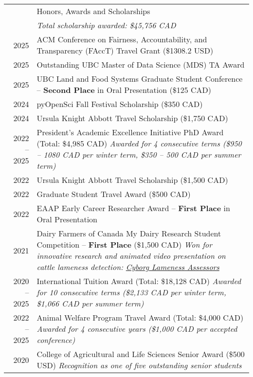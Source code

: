 \documentclass[letterpaper, 11pt]{article}
\newcommand{\headingfont}{\Large\color{OliveGreen}}
\newenvironment{SectionTableSingleSpace}[1]{
	\renewcommand*{\arraystretch}{1.2}
	\setlength{\tabcolsep}{10pt}
	\begin{longtable}{Rp{5.2in}} & #1 \\[0.6em]}
{\end{longtable}\vspace{-.3cm}}
\begin{document}
\begin{SectionTableSingleSpace}{\headingfont Honors, Awards and Scholarships}
& \textit{Total scholarship awarded: \$45,756 CAD} \\[6pt]
2025 &
ACM Conference on Fairness, Accountability, and Transparency (FAccT) Travel Grant (\$1308.2 USD) \\
2025 &
Outstanding UBC Master of Data Science (MDS) TA Award \\
2025 &
UBC Land and Food Systems Graduate Student Conference -- \textbf{Second Place} in Oral Presentation (\$125 CAD) \\
2024 & 
pyOpenSci Fall Festival Scholarship (\$350 CAD)  \\
2024 & 
Ursula Knight Abbott Travel Scholarship (\$1,750 CAD) \\
2022 -- 2025 & 
President's Academic Excellence Initiative PhD Award (Total: \$4,985 CAD) \newline
\textit{Awarded for 4 consecutive terms (\$950 -- 1080 CAD per winter term, \$350 -- 500 CAD per summer term)} \\
2022 & 
Ursula Knight Abbott Travel Scholarship (\$1,500 CAD) \\
2022 & 
Graduate Student Travel Award (\$500 CAD) \\
2022 & 
EAAP Early Career Researcher Award -- \textbf{First Place} in Oral Presentation \\
2021 & 
Dairy Farmers of Canada My Dairy Research Student Competition -- \textbf{First Place} (\$1,500 CAD) \newline
\textit{Won for innovative research and animated video presentation on cattle lameness detection: \href{https://youtu.be/HDe4uR7Tz9M?si=zMK2LjNmSAS5C4Mj}{Cyborg Lameness Assessors}} \\
2020 -- 2025 & 
International Tuition Award (Total: \$18,128 CAD) \newline
\textit{Awarded for 10 consecutive terms (\$2,133 CAD per winter term, \$1,066 CAD per summer term)} \\
2022 -- 2025 & 
Animal Welfare Program Travel Award (Total: \$4,000 CAD) \newline
\textit{Awarded for 4 consecutive years (\$1,000 CAD per accepted conference)} \\
2020 & 
College of Agricultural and Life Sciences Senior Award (\$500 USD) \newline
\textit{Recognition as one of five outstanding senior students} \\

\end{SectionTableSingleSpace}
\end{document}
